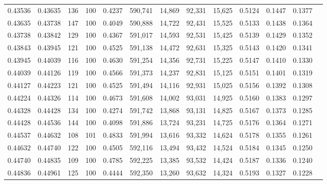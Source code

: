 \begin{tabular}{rrrrrrrrrrrrr}
0.43536 & 0.43635 &   136 & 100 &                                     0.4237 & 590,741 &  14,869 &  92,331 &  15,625 & 0.5124 & 0.1447 & 0.1377 \\
0.43635 & 0.43738 &   147 & 100 &                                     0.4049 & 590,888 &  14,722 &  92,431 &  15,525 & 0.5133 & 0.1438 & 0.1364 \\
0.43738 & 0.43842 &   129 & 100 &                                     0.4367 & 591,017 &  14,593 &  92,531 &  15,425 & 0.5139 & 0.1429 & 0.1352 \\
0.43843 & 0.43945 &   121 & 100 &                                     0.4525 & 591,138 &  14,472 &  92,631 &  15,325 & 0.5143 & 0.1420 & 0.1341 \\
0.43945 & 0.44039 &   116 & 100 &                                     0.4630 & 591,254 &  14,356 &  92,731 &  15,225 & 0.5147 & 0.1410 & 0.1330 \\
0.44039 & 0.44126 &   119 & 100 &                                     0.4566 & 591,373 &  14,237 &  92,831 &  15,125 & 0.5151 & 0.1401 & 0.1319 \\
0.44127 & 0.44223 &   121 & 100 &                                     0.4525 & 591,494 &  14,116 &  92,931 &  15,025 & 0.5156 & 0.1392 & 0.1308 \\
0.44224 & 0.44326 &   114 & 100 &                                     0.4673 & 591,608 &  14,002 &  93,031 &  14,925 & 0.5160 & 0.1383 & 0.1297 \\
0.44328 & 0.44428 &   134 & 100 &                                     0.4274 & 591,742 &  13,868 &  93,131 &  14,825 & 0.5167 & 0.1373 & 0.1285 \\
0.44428 & 0.44536 &   144 & 100 &                                     0.4098 & 591,886 &  13,724 &  93,231 &  14,725 & 0.5176 & 0.1364 & 0.1271 \\
0.44537 & 0.44632 &   108 & 101 &                                     0.4833 & 591,994 &  13,616 &  93,332 &  14,624 & 0.5178 & 0.1355 & 0.1261 \\
0.44632 & 0.44740 &   122 & 100 &                                     0.4505 & 592,116 &  13,494 &  93,432 &  14,524 & 0.5184 & 0.1345 & 0.1250 \\
0.44740 & 0.44835 &   109 & 100 &                                     0.4785 & 592,225 &  13,385 &  93,532 &  14,424 & 0.5187 & 0.1336 & 0.1240 \\
0.44836 & 0.44961 &   125 & 100 &                                     0.4444 & 592,350 &  13,260 &  93,632 &  14,324 & 0.5193 & 0.1327 & 0.1228 \\

\end{tabular}
